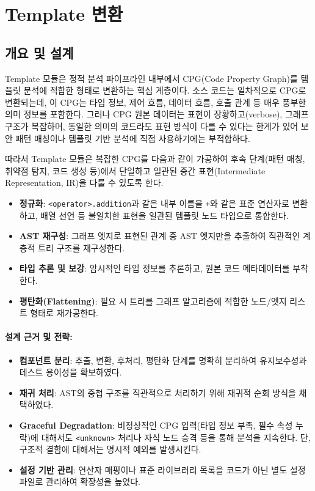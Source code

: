 \clearpage

\section{Template 변환}

\subsection{개요 및 설계}
Template 모듈은 정적 분석 파이프라인 내부에서 CPG(Code Property Graph)를 템플릿 분석에 적합한 형태로 변환하는 핵심 계층이다. 소스 코드는 일차적으로 CPG로 변환되는데, 이 CPG는 타입 정보, 제어 흐름, 데이터 흐름, 호출 관계 등 매우 풍부한 의미 정보를 포함한다. 그러나 CPG 원본 데이터는 표현이 장황하고(verbose), 그래프 구조가 복잡하며, 동일한 의미의 코드라도 표현 방식이 다를 수 있다는 한계가 있어 보안 패턴 매칭이나 템플릿 기반 분석에 직접 사용하기에는 부적합하다.

따라서 Template 모듈은 복잡한 CPG를 다음과 같이 가공하여 후속 단계(패턴 매칭, 취약점 탐지, 코드 생성 등)에서 단일하고 일관된 중간 표현(Intermediate Representation, IR)을 다룰 수 있도록 한다.

\begin{itemize}
    \item \textbf{정규화}: \texttt{<operator>.addition}과 같은 내부 이름을 \texttt{+}와 같은 표준 연산자로 변환하고, 배열 선언 등 불일치한 표현을 일관된 템플릿 노드 타입으로 통합한다.
    \item \textbf{AST 재구성}: 그래프 엣지로 표현된 관계 중 AST 엣지만을 추출하여 직관적인 계층적 트리 구조를 재구성한다.
    \item \textbf{타입 추론 및 보강}: 암시적인 타입 정보를 추론하고, 원본 코드 메타데이터를 부착한다.
    \item \textbf{평탄화(Flattening)}: 필요 시 트리를 그래프 알고리즘에 적합한 노드/엣지 리스트 형태로 재가공한다.
\end{itemize}

\paragraph{\textbf{설계 근거 및 전략}:}
\begin{itemize}
    \item \textbf{컴포넌트 분리}: 추출, 변환, 후처리, 평탄화 단계를 명확히 분리하여 유지보수성과 테스트 용이성을 확보하였다.
    \item \textbf{재귀 처리}: AST의 중첩 구조를 직관적으로 처리하기 위해 재귀적 순회 방식을 채택하였다.
    \item \textbf{Graceful Degradation}: 비정상적인 CPG 입력(타입 정보 부족, 필수 속성 누락)에 대해서도 \texttt{<unknown>} 처리나 자식 노드 승격 등을 통해 분석을 지속한다. 단, 구조적 결함에 대해서는 명시적 예외를 발생시킨다.
    \item \textbf{설정 기반 관리}: 연산자 매핑이나 표준 라이브러리 목록을 코드가 아닌 별도 설정 파일로 관리하여 확장성을 높였다.
\end{itemize}

